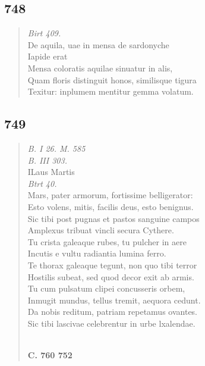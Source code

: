 \documentclass[11pt, a4paper]{report}
\begin{document}
            \subsection*{748}
      \begin{verse}
      \textit{Birt 409.} \\ De aquila, uae in mensa de sardonyche \\ Iapide erat \\ Mensa coloratis aquilae sinuatur in alis, \\ Quam floris distinguit honos, similisque tigura \\ Texitur: inplumem mentitur gemma volatum. \\ 
      \end{verse}
  
            \subsection*{749}
      \begin{verse}
      \textit{B. I 26. M. 585} \\ \textit{B. III 303.} \\ ILaus Martis \\ \textit{Btrt 40.} \\ Mars, pater armorum, fortissime belligerator: \\ Esto volens, mitis, facilis deus, esto benignus. \\ Sic tibi post pugnas et pastos sanguine campos \\ Amplexus tribuat vincli secura Cythere. \\ Tu crista galeaque rubes, tu pulcher in aere \\ Incutis e vultu radiantia lumina ferro. \\ Te thorax galeaque tegunt, non quo tibi terror \\ Hostilis subeat, sed quod decor exit ab armis. \\ Tu cum pulsatum clipei concusseris orbem, \\ Inmugit mundus, tellus tremit, aequora cedunt. \\ Da nobis reditum, patriam repetamus ovantes. \\ Sic tibi lascivae celebrentur in urbe lxalendae. \\ 
        ﻿\pagebreak 
    \begin{center} \textbf{C. 760 752} \end{center}
      \end{verse}
  
\end{document}
